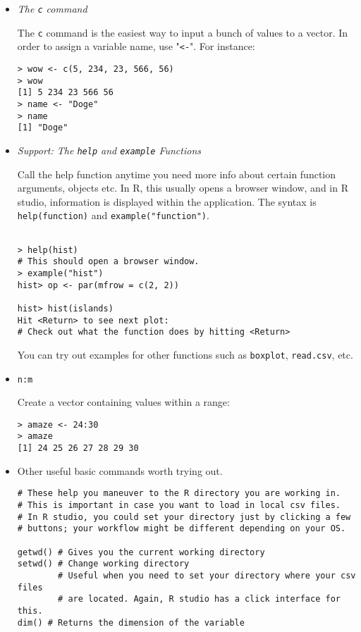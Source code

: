 \documentclass[12pt]{article}
\begin{document}
\begin{itemize}

\item \emph{The \texttt{c} command}

The \texttt{c} command is the easiest way to input a bunch of values to a vector.
In order to assign a variable name, use "\texttt{<-}". For instance:

\begin{verbatim}
> wow <- c(5, 234, 23, 566, 56)
> wow
[1] 5 234 23 566 56
> name <- "Doge"
> name
[1] "Doge"
\end{verbatim}


\item \emph{Support: The \texttt{help} and \texttt{example} Functions}

Call the help function anytime you need more info about certain function arguments,
objects etc. In R, this usually opens a browser window, and in R studio,
information is displayed within the application. The syntax is \texttt{help(function)}
and \texttt{example("function")}.

\begin{verbatim}

> help(hist)
# This should open a browser window.
> example("hist")
hist> op <- par(mfrow = c(2, 2))

hist> hist(islands)
Hit <Return> to see next plot:
# Check out what the function does by hitting <Return>
\end{verbatim}
You can try out examples for other functions such as \texttt{boxplot}, \texttt{read.csv}, etc.

\item \texttt{n:m}

Create a vector containing values within a range:

\begin{verbatim}
> amaze <- 24:30
> amaze
[1] 24 25 26 27 28 29 30
\end{verbatim}

\item Other useful basic commands worth trying out.
\begin{verbatim}
# These help you maneuver to the R directory you are working in.
# This is important in case you want to load in local csv files.
# In R studio, you could set your directory just by clicking a few
# buttons; your workflow might be different depending on your OS.

getwd() # Gives you the current working directory
setwd() # Change working directory
        # Useful when you need to set your directory where your csv files
        # are located. Again, R studio has a click interface for this.
dim() # Returns the dimension of the variable
\end{verbatim}
\end{itemize}
\end{document}
